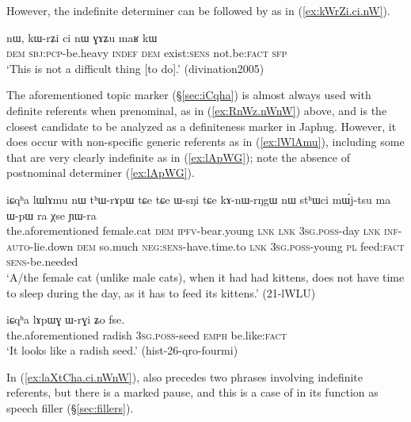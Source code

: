However, the indefinite determiner  can be followed by  as in (\ref{ex:kWrZi.ci.nW}).

\begin{exe}
\ex \label{ex:kWrZi.ci.nW}
\gll nɯ, kɯ-rʑi ci nɯ ɣɤʑu maʁ kɯ \\
\textsc{dem} \textsc{sbj}:\textsc{pcp}-be.heavy \textsc{indef} \textsc{dem} exist:\textsc{sens} not.be:\textsc{fact} \textsc{sfp} \\
\glt `This is not a difficult thing [to do].' (divination2005)
\end{exe}

The aforementioned topic marker  (§\ref{sec:iCqha}) is almost always used with definite referents when prenominal, as in (\ref{ex:RnWz.nWnW}) above, and is the closest candidate to be analyzed as a definiteness marker in Japhug. However, it does occur with non-specific generic referents as in (\ref{ex:lWlAmu}), including some that are very clearly indefinite as in (\ref{ex:lApWG}); note the absence of postnominal determiner  (\ref{ex:lApWG}).
\largerpage
\begin{exe}
\ex \label{ex:lWlAmu}
 \gll iɕqʰa lɯlɤmu nɯ tʰɯ-rɤpɯ tɕe tɕe ɯ-sŋi tɕe kɤ-nɯ-rŋgɯ nɯ stʰɯci mɯ́j-tsu ma ɯ-pɯ ra χse ɲɯ-ra   \\
 the.aforementioned female.cat \textsc{dem} \textsc{ipfv}-bear.young \textsc{lnk} \textsc{lnk} \textsc{3sg}.\textsc{poss}-day \textsc{lnk} \textsc{inf}-\textsc{auto}-lie.down \textsc{dem} so.much \textsc{neg}:\textsc{sens}-have.time.to \textsc{lnk} \textsc{3sg}.\textsc{poss}-young \textsc{pl} feed:\textsc{fact} \textsc{sens}-be.needed \\
 \glt `A/the female cat (unlike male cats), when it had had kittens, does not have time to sleep during the day, as it has to feed its kittens.' (21-lWLU) 
\end{exe}

\begin{exe}
\ex \label{ex:lApWG}
\gll  iɕqʰa lɤpɯɣ ɯ-rɣi ʑo fse. \\
the.aforementioned radish \textsc{3sg}.\textsc{poss}-seed \textsc{emph} be.like:\textsc{fact} \\
\glt `It looks like a radish seed.' (hist-26-qro-fourmi)
\end{exe}

In  (\ref{ex:laXtCha.ci.nWnW}),   also precedes two phrases involving indefinite referents, but  there is a marked pause, and this is a case of  in its function as speech filler (§\ref{sec:fillers}).

